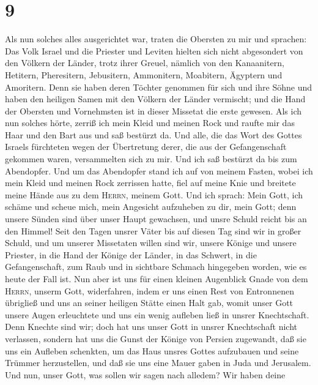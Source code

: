 \hypertarget{section-8}{%
\section{9}\label{section-8}}

 Als nun solches alles ausgerichtet war, traten die
Obersten zu mir und sprachen: Das Volk Israel und die Priester und
Leviten hielten sich nicht abgesondert von den Völkern der Länder, trotz
ihrer Greuel, nämlich von den Kanaanitern, Hetitern, Pheresitern,
Jebusitern, Ammonitern, Moabitern, Ägyptern und Amoritern.
 Denn sie haben deren Töchter genommen für sich und ihre
Söhne und haben den heiligen Samen mit den Völkern der Länder vermischt;
und die Hand der Obersten und Vornehmsten ist in dieser Missetat die
erste gewesen.  Als ich nun solches hörte, zerriß ich mein
Kleid und meinen Rock und raufte mir das Haar und den Bart aus und saß
bestürzt da.  Und alle, die das Wort des Gottes Israels
fürchteten wegen der Übertretung derer, die aus der Gefangenschaft
gekommen waren, versammelten sich zu mir. Und ich saß bestürzt da bis
zum Abendopfer.  Und um das Abendopfer stand ich auf von
meinem Fasten, wobei ich mein Kleid und meinen Rock zerrissen hatte,
fiel auf meine Knie und breitete meine Hände aus zu dem \textsc{Herrn},
meinem Gott.  Und ich sprach: Mein Gott, ich schäme und
scheue mich, mein Angesicht aufzuheben zu dir, mein Gott; denn unsere
Sünden sind über unser Haupt gewachsen, und unsre Schuld reicht bis an
den Himmel!  Seit den Tagen unsrer Väter bis auf diesen
Tag sind wir in großer Schuld, und um unserer Missetaten willen sind
wir, unsere Könige und unsere Priester, in die Hand der Könige der
Länder, in das Schwert, in die Gefangenschaft, zum Raub und in sichtbare
Schmach hingegeben worden, wie es heute der Fall ist.  Nun
aber ist uns für einen kleinen Augenblick Gnade von dem \textsc{Herrn},
unserm Gott, widerfahren, indem er uns einen Rest von Entronnenen
übrigließ und uns an seiner heiligen Stätte einen Halt gab, womit unser
Gott unsere Augen erleuchtete und uns ein wenig aufleben ließ in unsrer
Knechtschaft.  Denn Knechte sind wir; doch hat uns unser
Gott in unsrer Knechtschaft nicht verlassen, sondern hat uns die Gunst
der Könige von Persien zugewandt, daß sie uns ein Aufleben schenkten, um
das Haus unsres Gottes aufzubauen und seine Trümmer herzustellen, und
daß sie uns eine Mauer gaben in Juda und Jerusalem.  Und
nun, unser Gott, was sollen wir sagen nach alledem? Wir haben deine
